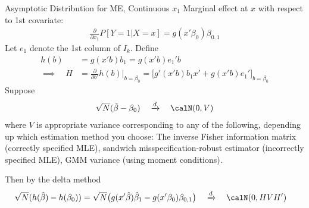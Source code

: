 \documentclass[aspectratio=169, handout]{beamer}
\newcommand{\dto}{\xrightarrow{d}}
\begin{document}
{\footnotesize
\begin{frame}{Asymptotic Distribution for ME, Continuous $x_1$}
Marginal effect at $x$ with respect to 1st covariate:
\begin{align*}
  \frac{\partial}{\partial x_1}
  P[Y=1|X=x]
  =
  g(x'\beta_0)\beta_{0,1}
\end{align*}
Let $e_1$ denote the 1st column of $I_k$.
Define
\begin{align*}
  h(b)&= g(x'b)b_1=g(x'b)e_1'b \\
  \implies\quad
  H
  &=
  \frac{\partial}{\partial b'}
  h(b)
  \big|_{b=\beta_0}
  =
  \big[
  g'(x'b)b_1x'
  +
  g(x'b)e_1'
  \big]_{b=\beta_0}
\end{align*}
Suppose
\begin{align*}
  \sqrt{N}(\hat{\beta}-\beta_0)
  \quad\dto\quad
  \calN(0,V)
\end{align*}
where $V$ is appropriate variance corresponding to any of the following,
depending up which estimation method you choose:
The inverse Fisher information matrix (correctly specified MLE),
sandwich misspecification-robust estimator (incorrectly specified MLE),
GMM variance (using moment conditions).

Then by the delta method
\begin{align*}
  &\sqrt{N}(h(\hat{\beta})-h(\beta_0))
  =
  \sqrt{N}\big(
    g(x'\hat{\beta})\hat{\beta}_1-g(x'\beta_0)\beta_{0,1}
  \big)
  \quad\dto\quad
  \calN(0,HVH')
\end{align*}
\end{frame}
}
\end{document}
